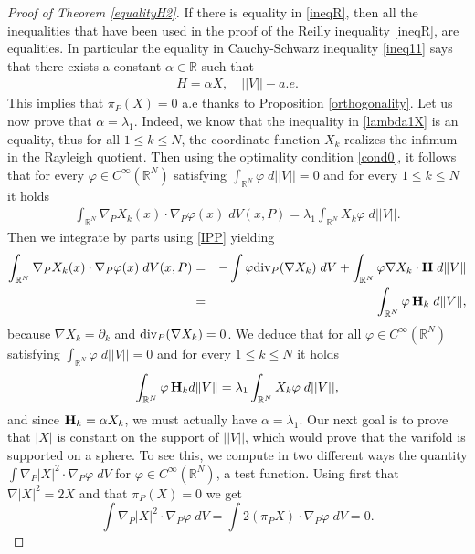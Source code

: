 \documentclass[12pt,english]{smfart} %
\theoremstyle{remark}
\newcommand{\R}{\mathbb{R}}
\newcommand{\Hm}{{\bf H}}
\begin{document}
\begin{proof}[Proof of Theorem \ref{equalityH2}] If there is equality in  \eqref{ineqR}, then all the inequalities that have been used in the proof of the Reilly inequality \eqref{ineqR}, are equalities. In particular the equality in Cauchy-Schwarz inequality \eqref{ineq11} says that there exists a constant $\alpha \in \R$ such that
 \begin{eqnarray}
  H=\alpha X, \quad  ||V||-a.e. \label{colinear1}
 \end{eqnarray} 
 This implies that $\pi_P(X)=0$  a.e  thanks to Proposition \ref{orthogonality}. Let us now prove that  $\alpha=\lambda_1$. Indeed, we know that the inequality in  \eqref{lambda1X} is an equality, thus for all $1\leqslant k \leqslant N$, the coordinate function $X_k$ realizes the infimum in the Rayleigh quotient. Then using the optimality condition \eqref{cond0},  it follows that  for every $\varphi \in C^{\infty}(\R^N)$  satisfying $\int_{\R^N} \varphi \; d||V||=0$ and for every $1\leqslant k \leqslant N$ it holds
 \begin{eqnarray}
\int_{\R^N} \nabla_P X_k(x) \cdot \nabla_P \varphi(x) \;d V(x,P) = \lambda_1 \int_{\R^N } X_k \varphi \;d||V||. \label{cond0}
 \end{eqnarray}
 Then we integrate by parts using  \eqref{IPP} yielding
 \begin{eqnarray}
 \int_{\R^N} \nabla_P X_k(x) \cdot \nabla_P \varphi(x) \;d V(x,P) &=& -\int  \varphi {\rm div}_P(\nabla X_k) \; dV + \int_{\mathbb{R}^N} \varphi   \nabla X_k \cdot \Hm \; d\|  V\| \notag \\
 &=&  \int_{\mathbb{R}^N} \varphi\,  \Hm_k \; d\|  V\| ,
 \end{eqnarray}
because $\nabla X_k=\partial_k$ and ${\rm div}_P(\nabla X_k)=0$. We deduce that for all $\varphi \in C^{\infty}(\R^N)$  satisfying $\int_{\R^N} \varphi \; d||V||=0$ and for every $1\leqslant k \leqslant N$ it holds
$$\int_{\mathbb{R}^N} \varphi\,  \Hm_k d\|  V\| =\lambda_1 \int_{\R^N } X_k \varphi \;d||V||,$$
 and since $\Hm_k=\alpha X_k$,  we must actually have $\alpha=\lambda_1$. Our next goal is to prove that $|X|$ is constant on the support of $||V||$, which would prove that the varifold is supported on a sphere.  To see this, we compute in two different ways the quantity $ \int  \nabla_P |X|^2 \cdot \nabla_P \varphi \;dV$ for  $\varphi \in C^\infty(\R^N)$, a test function. Using first that $\nabla |X|^2=2X$  and that $\pi_P(X)=0$ we get
$$ \int  \nabla_P |X|^2 \cdot \nabla_P \varphi \;dV=\int 2(\pi_PX )\cdot \nabla_P \varphi \;dV=0.$$

\end{proof}
\end{document}
